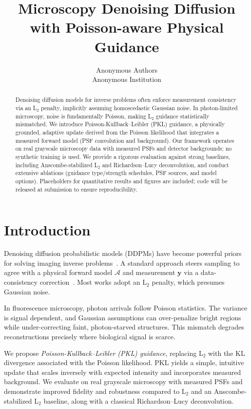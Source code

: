 \documentclass{article}
\title{Microscopy Denoising Diffusion with Poisson-aware Physical Guidance}
\author{Anonymous Authors\\
Anonymous Institution}
\begin{document}
\maketitle

\begin{abstract}
Denoising diffusion models for inverse problems often enforce measurement consistency via an L$_2$ penalty, implicitly assuming homoscedastic Gaussian noise. In photon-limited microscopy, noise is fundamentally Poisson, making L$_2$ guidance statistically mismatched. We introduce Poisson-Kullback--Leibler (PKL) guidance, a physically grounded, adaptive update derived from the Poisson likelihood that integrates a measured forward model (PSF convolution and background). Our framework operates on real grayscale microscopy data with measured PSFs and detector backgrounds; no synthetic training is used. We provide a rigorous evaluation against strong baselines, including Anscombe-stabilized L$_2$ and Richardson--Lucy deconvolution, and conduct extensive ablations (guidance type/strength schedules, PSF sources, and model options). Placeholders for quantitative results and figures are included; code will be released at submission to ensure reproducibility.
\end{abstract}

\section{Introduction}
\label{sec:intro}
Denoising diffusion probabilistic models (DDPMs) have become powerful priors for solving imaging inverse problems~\cite{ho2020ddpm, song2022solving}. A standard approach steers sampling to agree with a physical forward model $\mathcal{A}$ and measurement $\mathbf{y}$ via a data-consistency correction~\cite{chung2022diffusion}. Most works adopt an L$_2$ penalty, which presumes Gaussian noise.

In fluorescence microscopy, photon arrivals follow Poisson statistics. The variance is signal dependent, and Gaussian assumptions can over-penalize bright regions while under-correcting faint, photon-starved structures. This mismatch degrades reconstructions precisely where biological signal is scarce.

We propose \emph{Poisson-Kullback--Leibler (PKL) guidance}, replacing L$_2$ with the KL divergence associated with the Poisson likelihood. PKL yields a simple, intuitive update that scales inversely with expected intensity and incorporates measured background. We evaluate on real grayscale microscopy with measured PSFs and demonstrate improved fidelity and robustness compared to L$_2$ and an Anscombe-stabilized L$_2$ baseline, along with a classical Richardson--Lucy deconvolution.
\end{document}
